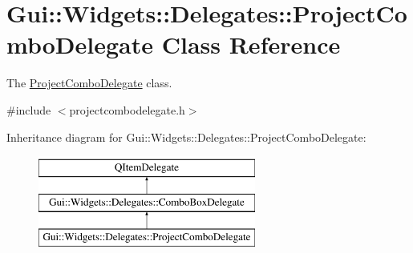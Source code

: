 \hypertarget{classGui_1_1Widgets_1_1Delegates_1_1ProjectComboDelegate}{}\section{Gui\+:\+:Widgets\+:\+:Delegates\+:\+:Project\+Combo\+Delegate Class Reference}
\label{classGui_1_1Widgets_1_1Delegates_1_1ProjectComboDelegate}


The \hyperlink{classGui_1_1Widgets_1_1Delegates_1_1ProjectComboDelegate}{Project\+Combo\+Delegate} class.  




{\ttfamily \#include $<$projectcombodelegate.\+h$>$}

Inheritance diagram for Gui\+:\+:Widgets\+:\+:Delegates\+:\+:Project\+Combo\+Delegate\+:\begin{figure}[H]
\begin{center}
\leavevmode
\includegraphics[height=3.000000cm]{d6/d93/classGui_1_1Widgets_1_1Delegates_1_1ProjectComboDelegate}
\end{center}
\end{figure}
